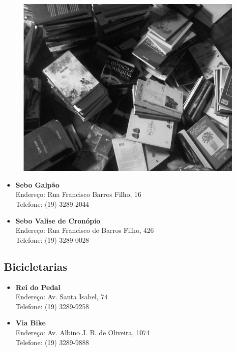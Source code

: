 \begin{figure}[h!]
    \centering
    \includegraphics[scale=0.29, keepaspectratio=true]{./img/imgs/9-outras_necessidades/-068.jpg}
\end{figure}


\begin{itemize}
    \item   \textbf{Sebo Galpão}
        \\Endereço: Rua Francisco Barros Filho, 16
        \\Telefone: (19) 3289-2044

    \item   \textbf{Sebo Valise de Cronópio}
        \\Endereço: Rua Francisco de Barros Filho, 426
        \\Telefone: (19) 3289-0028
\end{itemize}

\subsection{Bicicletarias}

\begin{itemize}
    \item   \textbf{Rei do Pedal}
        \\Endereço: Av. Santa Isabel, 74
        \\Telefone: (19) 3289-9258

    \item   \textbf{Via Bike}
        \\Endereço: Av. Albino J. B. de Oliveira, 1074
        \\Telefone: (19) 3289-9888
\end{itemize}

